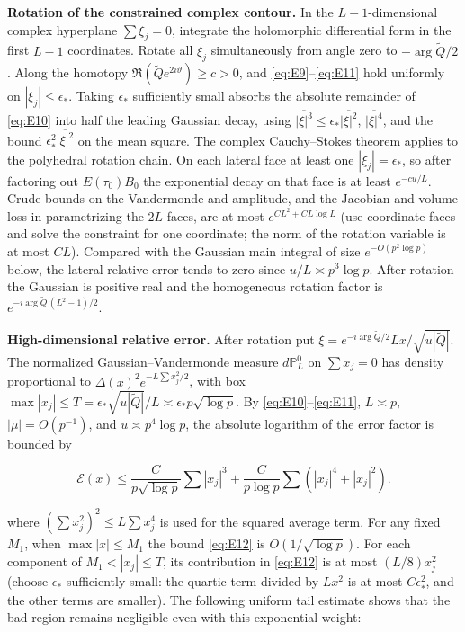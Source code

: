 \documentclass[11pt,a4paper]{article}
\numberwithin{equation}{section}
\theoremstyle{plain}
\theoremstyle{definition}
\begin{document}
\textbf{Rotation of the constrained complex contour.} In the \(L-1\)-dimensional complex hyperplane \(\sum\xi_j=0\), integrate the holomorphic differential form in the first \(L-1\) coordinates. Rotate all \(\xi_j\) simultaneously from angle zero to \(-\arg\widetilde Q/2\). Along the homotopy \(\Re(\widetilde Q e^{2i\vartheta})\ge c>0\), and \eqref{eq:E9}--\eqref{eq:E11} hold uniformly on \(|\xi_j|\le\epsilon_*\). Taking \(\epsilon_*\) sufficiently small absorbs the absolute remainder of \eqref{eq:E10} into half the leading Gaussian decay, using \(\overline{|\xi|^3}\le\epsilon_*\overline{|\xi|^2}\), \(\overline{|\xi|^4}\), and the bound \(\epsilon_*^2\overline{|\xi|^2}\) on the mean square. The complex Cauchy--Stokes theorem applies to the polyhedral rotation chain. On each lateral face at least one \(|\xi_j|=\epsilon_*\), so after factoring out \(E(\tau_0)B_0\) the exponential decay on that face is at least \(e^{-c u/L}\). Crude bounds on the Vandermonde and amplitude, and the Jacobian and volume loss in parametrizing the \(2L\) faces, are at most \(e^{C L^2+C L\log L}\) (use coordinate faces and solve the constraint for one coordinate; the norm of the rotation variable is at most \(C L\)). Compared with the Gaussian main integral of size \(e^{-O(p^2\log p)}\) below, the lateral relative error tends to zero since \(u/L\asymp p^3\log p\). After rotation the Gaussian is positive real and the homogeneous rotation factor is \(e^{-i\arg\widetilde Q\,(L^2-1)/2}\).

\textbf{High-dimensional relative error.} After rotation put \(\xi=e^{-i\arg\widetilde Q/2}L x/\sqrt{u|\widetilde Q|}\). The normalized Gaussian--Vandermonde measure \(d\mathbb P_L^0\) on \(\sum x_j=0\) has density proportional to \(\Delta(x)^2 e^{-L\sum x_j^2/2}\), with box \(\max|x_j|\le T=\epsilon_*\sqrt{u|\widetilde Q|}/L\asymp\epsilon_*p\sqrt{\log p}\). By \eqref{eq:E10}--\eqref{eq:E11}, \(L\asymp p\), \(|\mu|=O(p^{-1})\), and \(u\asymp p^4\log p\), the absolute logarithm of the error factor is bounded by

\begin{equation}
\mathscr E(x)\le \frac{C}{p\sqrt{\log p}}\sum |x_j|^3+\frac{C}{p\log p}\sum(|x_j|^4+|x_j|^2).
\label{eq:E12}
\end{equation}

where \((\sum x_j^2)^2\le L\sum x_j^4\) is used for the squared average term. For any fixed \(M_1\), when \(\max|x|\le M_1\) the bound \eqref{eq:E12} is \(O(1/\sqrt{\log p})\). For each component of \(M_1<|x_j|\le T\), its contribution in \eqref{eq:E12} is at most \((L/8)x_j^2\) (choose \(\epsilon_*\) sufficiently small: the quartic term divided by \(Lx^2\) is at most \(C\epsilon_*^2\), and the other terms are smaller). The following uniform tail estimate shows that the bad region remains negligible even with this exponential weight:
\end{document}
